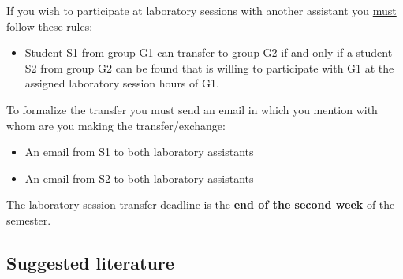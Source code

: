 \documentclass[../en-fa-lab.tex]{subfiles}
\begin{document}
If you wish to participate at laboratory sessions with another assistant
you \ul{must} follow these rules:

\begin{itemize}
\item
  Student S1 from group G1 can transfer to group G2 if and only if a
  student S2 from group G2 can be found that is willing to participate
  with G1 at the assigned laboratory session hours of G1.
\end{itemize}

To formalize the transfer you must send an email in which you mention
with whom are you making the transfer/exchange:

\begin{itemize}
\item
  An email from S1 to both laboratory assistants
\item
  An email from S2 to both laboratory assistants
\end{itemize}

The laboratory session transfer deadline is the \textbf{end of the
second week} of the semester.

\subsection{\texorpdfstring{\textbf{Suggested
literature}}{Suggested literature}}\label{suggested-literature}
\end{document}
